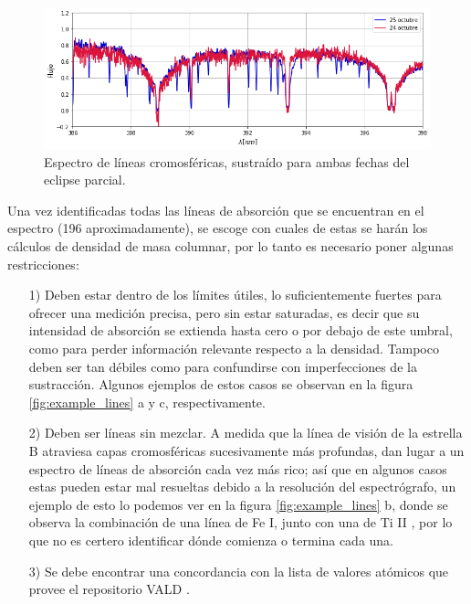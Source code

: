 \documentclass[12pt,oneside,openany,letter]{book}
\begin{document}
\begin{figure}[h]
    \centering
    \includegraphics[width=1\linewidth]{Gaficas/sustracciones.png}
    \caption{Espectro de líneas cromosféricas, sustraído para ambas fechas del eclipse parcial.}
    \label{fig:sustracciones}
\end{figure}

Una vez identificadas todas las líneas de absorción que se encuentran en el espectro (196 aproximadamente), se escoge con cuales de estas se harán los cálculos de densidad de masa columnar, por lo tanto es necesario poner algunas restricciones:

\begin{itemize}
    \item[1)] Deben estar dentro de los límites útiles, lo suficientemente fuertes para ofrecer una medición precisa, pero sin estar saturadas, es decir que su intensidad de absorción se extienda hasta cero o por debajo de este umbral,  como para perder información relevante respecto a la densidad. Tampoco deben ser tan débiles como para confundirse con imperfecciones de la sustracción. Algunos ejemplos de estos casos se observan en la figura \ref{fig:example_lines} a y c, respectivamente.
    
    \item[2)] Deben ser líneas sin mezclar. A medida que la línea de visión de la estrella B atraviesa capas cromosféricas sucesivamente más profundas, dan lugar a un espectro de líneas de absorción cada vez más rico; así que en algunos casos estas pueden estar mal resueltas debido a la resolución del espectrógrafo, un ejemplo de esto lo podemos ver en la figura \ref{fig:example_lines} b, donde se observa la combinación de una línea de Fe I, junto con una de Ti II , por lo que no es certero identificar dónde comienza o termina cada una.
    
    \item[3)] Se debe encontrar una concordancia con la lista de valores atómicos que provee el repositorio VALD \citep{ryabchikova1997vienna}.
\end{itemize}
\end{document}
